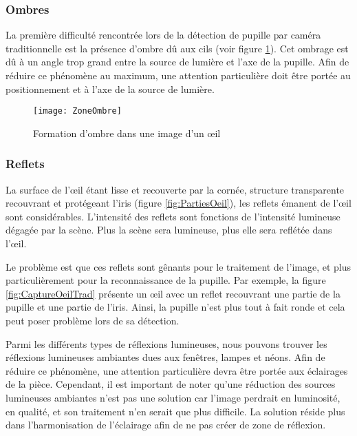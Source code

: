 \subsubsection{Ombres}

La première difficulté rencontrée lors de la détection de pupille par caméra traditionnelle est la présence d’ombre dû aux cils (voir figure \ref{fig:ZoneOmbre}). Cet ombrage est dû à un angle trop grand entre la source de lumière et l’axe de la pupille. Afin de réduire ce phénomène au maximum, une attention particulière doit être portée au positionnement et à l’axe de la source de lumière.

\begin{figure}[h]
  \centering
  \texttt{[image: ZoneOmbre]}
  \caption{Formation d’ombre dans une image d’un œil}
  \label{fig:ZoneOmbre}
\end{figure}

\subsubsection{Reflets}

La surface de l’œil étant lisse et recouverte par la cornée, structure transparente recouvrant et protégeant l’iris (figure \ref{fig:PartiesOeil}), les reflets émanent de l’œil sont considérables. 
L’intensité des reflets sont fonctions de l’intensité lumineuse dégagée par la scène. Plus la scène sera lumineuse, plus elle sera reflétée dans l’œil.

Le problème est que ces reflets sont gênants pour le traitement de l’image, et plus particulièrement pour la reconnaissance de la pupille. Par exemple, la figure \ref{fig:CaptureOeilTrad} présente un œil avec un reflet recouvrant une partie de la pupille et une partie de l’iris. Ainsi, la pupille n’est plus tout à fait ronde et cela peut poser problème lors de sa détection. 

Parmi les différents types de réflexions lumineuses, nous pouvons trouver les réflexions lumineuses ambiantes dues aux fenêtres, lampes et néons.
Afin de réduire ce phénomène, une attention particulière devra être portée aux éclairages de la pièce. Cependant, il est important de noter qu’une réduction des sources lumineuses ambiantes n’est pas une solution car l’image perdrait en luminosité, en qualité, et son traitement n’en serait que plus difficile. La solution réside plus dans l’harmonisation de l’éclairage afin de ne pas créer de zone de réflexion.

